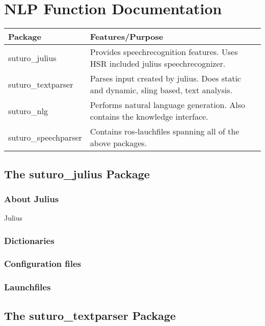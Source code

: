 \documentclass[main.tex]{subfiles}
\begin{document}
	\begingroup

	\renewcommand{\cleardoublepage}{}

	\renewcommand{\clearpage}{}
	
	\newpage

	\chapter{NLP Function Documentation}
		
		
	\begin{tabular}{|l|p{9cm}|}
		\hline
		\textbf{Package} & \textbf{Features/Purpose} \\
		\hline
		suturo\_julius & Provides speechrecognition features. Uses HSR included julius speechrecognizer. \\
		\hline 
		suturo\_textparser & Parses input created by julius. Does static and dynamic, sling based, text analysis. \\
		\hline
		suturo\_nlg & Performs natural language generation. Also contains the knowledge interface. \\
		\hline 
		suturo\_speechparser & Contains ros-lauchfiles spanning all of the above packages.\\
		\hline
	\end{tabular}
	
	\section{The suturo\_julius Package}
		\subsection{About Julius}
			Julius 	
		\subsection{Dictionaries}
		\subsection{Configuration files}
		\subsection{Launchfiles}
	
	\section{The suturo\_textparser Package}
\end{document}
